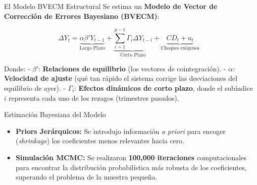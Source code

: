 \documentclass[
  10pt,
  ignorenonframetext,
  aspectratio=169,
  spanish,
]{beamer}
\providecommand{\tightlist}{%
  \setlength{\itemsep}{0pt}\setlength{\parskip}{0pt}}
\begin{document}
\begin{frame}{El Modelo BVECM Estructural}
\protect{}\label{el-modelo-bvecm-estructural}
Se estima un \textbf{Modelo de Vector de Corrección de Errores Bayesiano
(BVECM)}:

\[\Delta Y_t = \underbrace{\alpha \beta' Y_{t-1}}_{\text{Largo Plazo}} + \underbrace{\sum_{i=1}^{p-1} \Gamma_i \Delta Y_{t-i}}_{\text{Corto Plazo}} + \underbrace{C D_t + u_t}_{\text{Choques exógenos}}\]

Donde: - \textbf{\(\beta'\)}: \textbf{Relaciones de equilibrio} (los
vectores de cointegración). - \textbf{\(\alpha\)}: \textbf{Velocidad de
ajuste} (qué tan rápido el sistema corrige las desviaciones del
equilibrio de ayer). - \textbf{\(\Gamma_i\)}: \textbf{Efectos dinámicos
de corto plazo}, donde el subíndice \textbf{\(i\)} representa cada uno
de los rezagos (trimestres pasados).

\vspace{0.2cm}

\begin{block}{Estimación Bayesiana del Modelo}
\protect{}\label{estimaciuxf3n-bayesiana-del-modelo}
\begin{itemize}
\tightlist
\item
  \textbf{Priors Jerárquicos:} Se introdujo información \emph{a priori}
  para encoger (\emph{shrinkage}) los coeficientes menos relevantes
  hacia cero.
\item
  \textbf{Simulación MCMC:} Se realizaron \textbf{100,000 iteraciones}
  computacionales para encontrar la distribución probabilística más
  robusta de los coeficientes, superando el problema de la muestra
  pequeña.
\end{itemize}
\end{block}
\end{frame}
\end{document}
